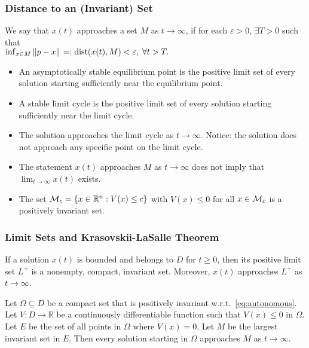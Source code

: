 \begin{frame}
    \frametitle{Distance to an (Invariant) Set }

    \begin{definition}
        We say that $x(t)$ approaches a set $M$ as $t \to \infty$, if for each 
        $\varepsilon > 0$, $\exists T > 0$ such that\\[0.5ex] 
        \hspace{22mm} $ \inf_{x \in M} \|{p-x}\|_{{}_{}} =: \text{dist}(x(t),  M) <
        \varepsilon, \; \forall t > T. $\\[0.5ex]
    \end{definition}
    \vspace{-3mm}
    \begin{itemize}
        \item An asymptotically stable equilibrium point is the positive limit
        set of every solution starting sufficiently near the equilibrium point.
        \item A stable limit cycle is the positive limit set of every solution 
        starting sufficiently near the limit cycle.
        \item The solution approaches the limit cycle as $t \to \infty$. Notice:
        the solution does not approach any specific point on the limit cycle.
        \item The statement $x(t)$ approaches $M$ as $t \to \infty$ does not
        imply that $\lim_{t \to \infty} x(t)$ exists.
        \item The set $\mathcal{M}_c = \{x \in \mathbb{R}^n: V(x) \leq c\}$ with
        $\dot{V}(x) \leq 0$ for all $x \in \mathcal{M}_c$ is a positively invariant
        set.
    \end{itemize}
\end{frame}


\begin{frame}
    \frametitle{Limit Sets and Krasovskii-LaSalle Theorem}

    \begin{lemma}
        If a solution $x(t)$ is bounded and belongs to $D$ for $t \geq 0$, then
        its positive limit set $L^+$ is a nonempty, compact, invariant set.
        Moreover, $x(t)$ approaches $L^+$ as $t \to \infty$.
    \end{lemma}

    \begin{theorem}
        Let $\Omega \subseteq D$ be a compact set that is positively invariant
        w.r.t.~\eqref{eq:autonomous}. Let $V: D \rightarrow \mathbb{R}$ be a
        continuously differentiable function such that $\dot{V}(x) \leq 0$ in
        $\Omega$. Let $E$ be the set of all points in $\Omega$ where $\dot{V}(x)
        = 0$. Let $M$ be the largest invariant set in $E$. Then every solution
        starting in $\Omega$ approaches $M$ as $t \to \infty$.
    \end{theorem}
\end{frame}

